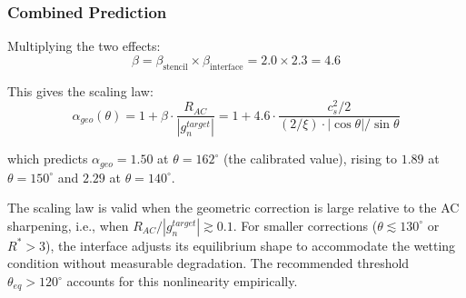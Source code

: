 \subsubsection{Combined Prediction}

Multiplying the two effects:
\begin{equation}
    \beta = \beta_{\text{stencil}} \times \beta_{\text{interface}} = 2.0 \times 2.3 = 4.6
\end{equation}

This gives the scaling law:
\begin{equation}
    \alpha_{geo}(\theta) = 1 + \beta \cdot \frac{R_{AC}}{|g_n^{target}|} = 1 + 4.6 \cdot \frac{c_s^2/2}{(2/\xi) \cdot |\cos\theta|/\sin\theta}
\end{equation}

which predicts $\alpha_{geo} = 1.50$ at $\theta = 162^\circ$ (the calibrated value), rising to $1.89$ at $\theta = 150^\circ$ and $2.29$ at $\theta = 140^\circ$.

The scaling law is valid when the geometric correction is large relative to the AC sharpening, i.e., when $R_{AC} / |g_n^{target}| \gtrsim 0.1$. For smaller corrections ($\theta \lesssim 130^\circ$ or $R^* > 3$), the interface adjusts its equilibrium shape to accommodate the wetting condition without measurable degradation. The recommended threshold $\theta_{eq} > 120^\circ$ accounts for this nonlinearity empirically.
